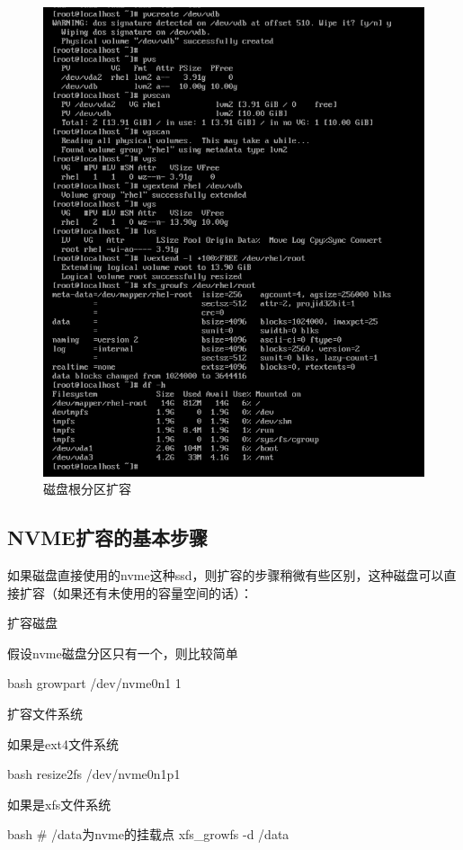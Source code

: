 \begin{figure}[H]
  \centering
  \includegraphics[scale=0.3]{extendlvm.png}
  \caption{磁盘根分区扩容}
  \label{fig:extendlvm}
\end{figure}

\subsection{NVME扩容的基本步骤}
如果磁盘直接使用的nvme这种ssd，则扩容的步骤稍微有些区别，这种磁盘可以直接扩容（如果还有未使用的容量空间的话）：
\begin{outline}[enumerate]
  \1 扩容磁盘

假设nvme磁盘分区只有一个，则比较简单
\begin{code-block}{bash}
growpart /dev/nvme0n1 1
\end{code-block}

  \1 扩容文件系统

如果是ext4文件系统
\begin{code-block}{bash}
resize2fs /dev/nvme0n1p1
\end{code-block}

如果是xfs文件系统
\begin{code-block}{bash}
# /data为nvme的挂载点
xfs_growfs -d /data
\end{code-block}


\end{outline}
